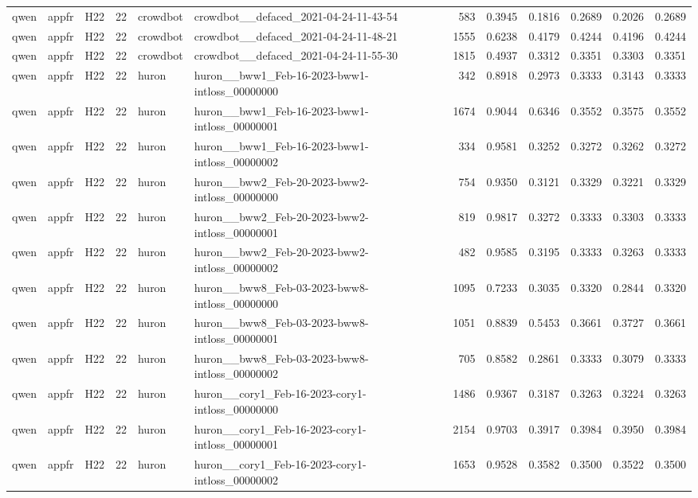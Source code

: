 \begin{table}[tbp]
\begin{tabular}{lllrllrrrrrr}
qwen & appfr & H22 & 22 & crowdbot & crowdbot\_\_defaced\_2021-04-24-11-43-54 & 583 & 0.3945 & 0.1816 & 0.2689 & 0.2026 & 0.2689 \\
qwen & appfr & H22 & 22 & crowdbot & crowdbot\_\_defaced\_2021-04-24-11-48-21 & 1555 & 0.6238 & 0.4179 & 0.4244 & 0.4196 & 0.4244 \\
qwen & appfr & H22 & 22 & crowdbot & crowdbot\_\_defaced\_2021-04-24-11-55-30 & 1815 & 0.4937 & 0.3312 & 0.3351 & 0.3303 & 0.3351 \\
qwen & appfr & H22 & 22 & huron & huron\_\_bww1\_Feb-16-2023-bww1-intloss\_00000000 & 342 & 0.8918 & 0.2973 & 0.3333 & 0.3143 & 0.3333 \\
qwen & appfr & H22 & 22 & huron & huron\_\_bww1\_Feb-16-2023-bww1-intloss\_00000001 & 1674 & 0.9044 & 0.6346 & 0.3552 & 0.3575 & 0.3552 \\
qwen & appfr & H22 & 22 & huron & huron\_\_bww1\_Feb-16-2023-bww1-intloss\_00000002 & 334 & 0.9581 & 0.3252 & 0.3272 & 0.3262 & 0.3272 \\
qwen & appfr & H22 & 22 & huron & huron\_\_bww2\_Feb-20-2023-bww2-intloss\_00000000 & 754 & 0.9350 & 0.3121 & 0.3329 & 0.3221 & 0.3329 \\
qwen & appfr & H22 & 22 & huron & huron\_\_bww2\_Feb-20-2023-bww2-intloss\_00000001 & 819 & 0.9817 & 0.3272 & 0.3333 & 0.3303 & 0.3333 \\
qwen & appfr & H22 & 22 & huron & huron\_\_bww2\_Feb-20-2023-bww2-intloss\_00000002 & 482 & 0.9585 & 0.3195 & 0.3333 & 0.3263 & 0.3333 \\
qwen & appfr & H22 & 22 & huron & huron\_\_bww8\_Feb-03-2023-bww8-intloss\_00000000 & 1095 & 0.7233 & 0.3035 & 0.3320 & 0.2844 & 0.3320 \\
qwen & appfr & H22 & 22 & huron & huron\_\_bww8\_Feb-03-2023-bww8-intloss\_00000001 & 1051 & 0.8839 & 0.5453 & 0.3661 & 0.3727 & 0.3661 \\
qwen & appfr & H22 & 22 & huron & huron\_\_bww8\_Feb-03-2023-bww8-intloss\_00000002 & 705 & 0.8582 & 0.2861 & 0.3333 & 0.3079 & 0.3333 \\
qwen & appfr & H22 & 22 & huron & huron\_\_cory1\_Feb-16-2023-cory1-intloss\_00000000 & 1486 & 0.9367 & 0.3187 & 0.3263 & 0.3224 & 0.3263 \\
qwen & appfr & H22 & 22 & huron & huron\_\_cory1\_Feb-16-2023-cory1-intloss\_00000001 & 2154 & 0.9703 & 0.3917 & 0.3984 & 0.3950 & 0.3984 \\
qwen & appfr & H22 & 22 & huron & huron\_\_cory1\_Feb-16-2023-cory1-intloss\_00000002 & 1653 & 0.9528 & 0.3582 & 0.3500 & 0.3522 & 0.3500 \\

\end{tabular}
\end{table}
